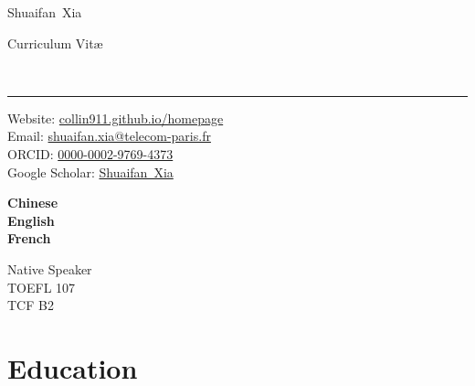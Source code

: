 \documentclass[9pt,a4paper]{article}
\makeatletter
\newcommand{\Title}{Curriculum Vit\ae}
\newcommand{\FirstName}{Shuaifan}
\newcommand{\LastName}{Xia}
\newcommand{\MyName}{\FirstName\ \LastName}
\newcommand{\Email}{shuaifan.xia@telecom-paris.fr}
\newcommand{\PersonalWebsite}{collin911.github.io/homepage}
\newcommand{\ORCID}{0000-0002-9769-4373}
\newcommand{\Website}[1]{\href{https://#1}{#1}}
\makeatother
\begin{document}
\begin{minipage}[t]{0.5\textwidth}
  {\fontsize{20pt}{0}\selectfont\MyName}
\end{minipage}
\begin{minipage}[t]{0.5\textwidth}
  \begin{flushright}
    \Title{}
  \end{flushright}
\end{minipage}
\\[-0.1cm]
\textcolor{lightgray}{\rule{\textwidth}{3pt}}
\begin{minipage}[t]{0.75\textwidth}
  Website: \Website{\PersonalWebsite}
  \\
  Email: \href{mailto:\Email}{\Email}
  \\
  ORCID: \href{https://orcid.org/\ORCID}{\ORCID}
  \\
  Google Scholar: \href{https://scholar.google.com/citations?user=x4Y8uCAAAAAJ}{\MyName}
\end{minipage}
\begin{minipage}[t]{0.07\textwidth}
    \textbf{Chinese} 
    \\
    \textbf{English} 
    \\
    \textbf{French} 
    \\
\end{minipage}
\begin{minipage}[t]{0.18\textwidth}
  \begin{flushright}
    Native Speaker
    \\
    TOEFL 107
    \\
    TCF B2
    \\
  \end{flushright}
\end{minipage}


\section{Education}
\end{document}
